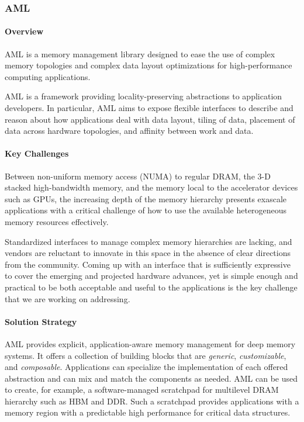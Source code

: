 \subsubsection*{AML}

\paragraph{Overview}

AML is a memory management library designed to ease the use of complex
memory topologies and complex data layout optimizations for
high-performance computing applications.

AML is a framework providing locality-preserving abstractions to
application developers.  In particular, AML aims to expose flexible
interfaces to describe and reason about how applications deal with data
layout, tiling of data, placement of data across hardware topologies, and
affinity between work and data.

\paragraph{Key Challenges}

Between non-uniform memory access (NUMA) to regular DRAM, the 3-D stacked
high-bandwidth memory, and the memory local to the accelerator devices such
as GPUs, the increasing depth of the memory hierarchy presents exascale
applications with a critical challenge of how to use the available
heterogeneous memory resources effectively.

Standardized interfaces to manage complex memory hierarchies are lacking,
and vendors are reluctant to innovate in this space in the absence of clear
directions from the community.  Coming up with an interface that is
sufficiently expressive to cover the emerging and projected hardware
advances, yet is simple enough and practical to be both acceptable and
useful to the applications is the key challenge that we are working on
addressing.

\paragraph{Solution Strategy}

AML provides explicit, application-aware memory management for deep memory
systems.  It offers a collection of building blocks that
are \emph{generic}, \emph{customizable}, and \emph{composable}.
Applications can specialize the implementation of each offered abstraction
and can mix and match the components as needed.  AML can be used to create,
for example, a software-managed scratchpad for multilevel DRAM hierarchy
such as HBM and DDR.  Such a scratchpad provides applications with a memory
region with a predictable high performance for critical data structures.


